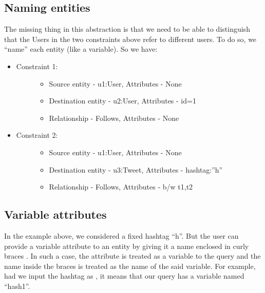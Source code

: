 \documentclass[letterpaper,10pt,english]{sphinxmanual}
\begin{document}
\subsection{Naming entities}
\label{\detokenize{neo4j_query_generation:naming-entities}}
The missing thing in this abstraction is that we need to be able to distinguish that the Users in the two constraints above refer to different users. To do so, we “name” each entity (like a variable). So we have:
\begin{itemize}
\item {} \begin{description}
\item[{Constraint 1:}] \leavevmode\begin{itemize}
\item {} 
Source entity - u1:User, Attributes - None

\item {} 
Destination entity - u2:User, Attributes - id=1

\item {} 
Relationship - Follows, Attributes - None

\end{itemize}

\end{description}

\item {} \begin{description}
\item[{Constraint 2:}] \leavevmode\begin{itemize}
\item {} 
Source entity - u1:User, Attributes - None

\item {} 
Destination entity - u3:Tweet, Attributes - hashtag:”h”

\item {} 
Relationship - Follows, Attributes - b/w t1,t2

\end{itemize}

\end{description}

\end{itemize}


\subsection{Variable attributes}
\label{\detokenize{neo4j_query_generation:variable-attributes}}
In the example above, we considered a fixed hashtag “h”. But the user can provide a variable attribute to an entity by giving it a name enclosed in curly braces \sphinxcode{\{\}}. In such a case, the attribute is treated as a variable to the query and the name inside the braces is treated as the name of the said variable. For example, had we input the hashtag as , it means that our query has a variable named “hash1”.
\end{document}
